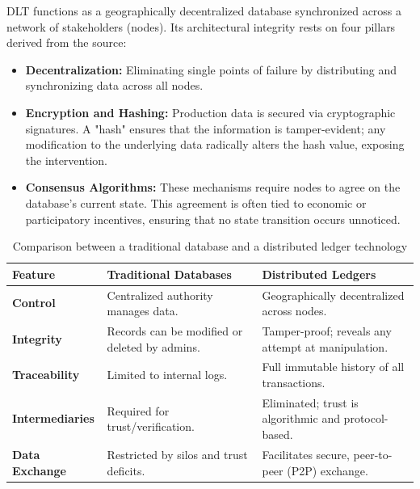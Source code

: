 \documentclass{scrbook}
\begin{document}
DLT functions as a geographically decentralized database synchronized across a network of stakeholders (nodes). Its architectural integrity rests on four pillars derived from the source:
\begin{itemize}
    \item \textbf{Decentralization:} Eliminating single points of failure by distributing and synchronizing data across all nodes.
    
    \item \textbf{Encryption and Hashing:} Production data is secured via cryptographic signatures. A "hash" ensures that the information is tamper-evident; any modification to the underlying data radically alters the hash value, exposing the intervention.
    
    \item \textbf{Consensus Algorithms:} These mechanisms require nodes to agree on the database’s current state. This agreement is often tied to economic or participatory incentives, ensuring that no state transition occurs unnoticed.
\end{itemize}

\begin{table}[]
    \centering
    \begin{tabularx}{\linewidth}{|X|X|X|}\hline
         \textbf{Feature} & \textbf{Traditional Databases} & \textbf{Distributed Ledgers}\\
         \hline

        \textbf{Control} & Centralized authority manages data. & Geographically decentralized across nodes.\\
        \hline

        \textbf{Integrity} & Records can be modified or deleted by admins. & Tamper-proof; reveals any attempt at manipulation.\\
        \hline

        \textbf{Traceability} & Limited to internal logs. & Full immutable history of all transactions.\\
        \hline

        \textbf{Intermediaries} & Required for trust/verification. & Eliminated; trust is algorithmic and protocol-based.\\
        \hline

        \textbf{Data Exchange} & Restricted by silos and trust deficits. & Facilitates secure, peer-to-peer (P2P) exchange.\\
        \hline
         
    \end{tabularx}
    \caption{Comparison between a traditional database and a distributed ledger technology}
    \label{tab:database_dlt_comparison}
\end{table}
\end{document}
